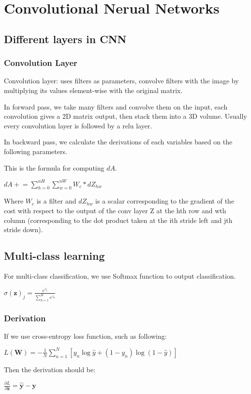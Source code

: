 \documentclass{article}
\begin{document}
\section{Convolutional Nerual Networks}
	\subsection{Different layers in CNN}
		\subsubsection{Convolution Layer}
			\begin{flushleft}
				Convolution layer: uses filters as parameters, convolve filters with the image by multiplying its values element-wise with the original matrix.
			\end{flushleft}
			\begin{flushleft}
				In forward pass, we take many filters and convolve them on the input, each convolution gives a 2D matrix output, then stack them into a 3D volume. Usually every convolution layer is followed by a relu layer.
			\end{flushleft}
			\begin{flushleft}
				In backward pass, we calculate the derivations of each variables based on the following parameters.
			\end{flushleft}
				This is the formula for computing $dA$.
			\begin{center}
				$dA \mathrel{+}= \sum_{h=0}^{nH} \sum_{w=0}^{nW} W_c * dZ_{hw}$
			\end{center}
			\begin{flushleft}
				Where $W_c$ is a filter and $dZ_{hw}$ is a scalar corresponding to the gradient of the cost with respect to the output of the conv layer Z at the hth row and wth column (corresponding to the dot product taken at the ith stride left and jth stride down).	
			\end{flushleft}
	\subsection{Multi-class learning}
		For multi-class classification, we use Softmax function to output classification.
		\begin{center}
			$\sigma(\bm{z})_j = \frac{e^{z_j}}{\sum_{k=1}^{K}e^{z_k}}$
		\end{center}
		\subsubsection{Derivation}
			\begin{flushleft}
				If we use cross-entropy loss function, such as following:
			\end{flushleft}
			\begin{center}
				$L(\bm{W}) = - \frac{1}{N}\sum_{n=1}^{N}[y_n\log\hat{y}+(1-y_n)\log(1-\hat{y})]$
			\end{center}
			\begin{flushleft}
				Then the derivation should be:
			\end{flushleft}
			\begin{center}
				$\frac{\partial L}{\partial \bm{z}}= \bm{\hat{y}} - \bm{y}$
			\end{center}
\end{document}
